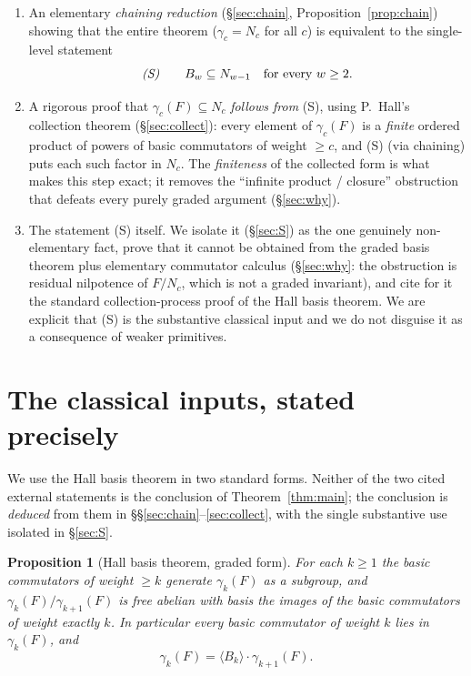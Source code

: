 \documentclass{amsart}
\newtheorem{proposition}{Proposition}
\theoremstyle{definition}
\theoremstyle{remark}
\begin{document}
\begin{enumerate}
\item[(I)] An elementary \emph{chaining reduction} (\S\ref{sec:chain},
Proposition~\ref{prop:chain}) showing that the entire theorem
($\gamma_c=N_c$ for all $c$) is equivalent to the single-level statement
\begin{equation}\label{eq:S}
\text{\emph{(S)}}\qquad B_w\subseteq N_{w-1}\quad\text{for every }w\ge 2 .
\end{equation}
\item[(II)] A rigorous proof that $\gamma_c(F)\subseteq N_c$ \emph{follows from}
(S), using P.~Hall's collection theorem (\S\ref{sec:collect}): every element of
$\gamma_c(F)$ is a \emph{finite} ordered product of powers of basic commutators of
weight $\ge c$, and (S) (via chaining) puts each such factor in $N_c$. The
\emph{finiteness} of the collected form is what makes this step exact; it removes
the ``infinite product / closure'' obstruction that defeats every purely graded
argument (\S\ref{sec:why}).
\item[(III)] The statement (S) itself. We isolate it (\S\ref{sec:S}) as the one
genuinely non-elementary fact, prove that it cannot be obtained from the graded
basis theorem plus elementary commutator calculus (\S\ref{sec:why}: the
obstruction is residual nilpotence of $F/N_c$, which is not a graded invariant),
and cite for it the standard collection-process proof of the Hall basis theorem.
We are explicit that (S) is the substantive classical input and we do not disguise
it as a consequence of weaker primitives.
\end{enumerate}

\section{The classical inputs, stated precisely}\label{sec:input}

We use the Hall basis theorem in two standard forms. Neither of the two cited
external statements is the conclusion of Theorem~\ref{thm:main}; the conclusion
is \emph{deduced} from them in \S\S\ref{sec:chain}--\ref{sec:collect}, with the
single substantive use isolated in \S\ref{sec:S}.

\begin{proposition}[Hall basis theorem, graded form]\label{prop:hall}
For each $k\ge 1$ the basic commutators of weight $\ge k$ generate $\gamma_k(F)$
\emph{as a subgroup}, and $\gamma_k(F)/\gamma_{k+1}(F)$ is free abelian with basis
the images of the basic commutators of weight exactly $k$. In particular every
basic commutator of weight $k$ lies in $\gamma_k(F)$, and
\begin{equation}\label{eq:hall-decomp}
\gamma_k(F)=\langle B_k\rangle\cdot\gamma_{k+1}(F).
\end{equation}
\end{proposition}
\end{document}
